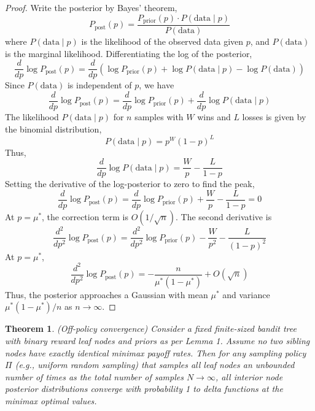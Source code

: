 \documentclass[11pt]{article}
\theoremstyle{definitionstyle}
\newtheorem{thm}{Theorem}
\newenvironment{framedminipage}
    {\begin{framed}\begin{minipage}{0.9\textwidth}}
    {\end{minipage}\end{framed}}
\begin{document}
\begin{proof} Write the posterior by Bayes' theorem,
\[
P_{\text{post}}(p) = \frac{P_{\text{prior}}(p) \cdot P(\text{data} \mid p)}{P(\text{data})}
\]
where \(P(\text{data} \mid p)\) is the likelihood of the observed data given \(p\), and \(P(\text{data})\) is the marginal likelihood. Differentiating the log of the posterior,
\[
\frac{d}{dp} \log P_{\text{post}}(p) = \frac{d}{dp} \left( \log P_{\text{prior}}(p) + \log P(\text{data} \mid p) - \log P(\text{data}) \right)
\]
Since \(P(\text{data})\) is independent of \(p\), we have
\[
\frac{d}{dp} \log P_{\text{post}}(p) = \frac{d}{dp} \log P_{\text{prior}}(p) + \frac{d}{dp} \log P(\text{data} \mid p)
\]
The likelihood \(P(\text{data} \mid p)\) for \(n\) samples with \(W\) wins and \(L\) losses is given by the binomial distribution,
\[
P(\text{data} \mid p) = p^W (1 - p)^L
\]
Thus,
\[
\frac{d}{dp} \log P(\text{data} \mid p) = \frac{W}{p} - \frac{L}{1 - p}
\]
Setting the derivative of the log-posterior to zero to find the peak,
\[
\frac{d}{dp} \log P_{\text{post}}(p) = \frac{d}{dp} \log P_{\text{prior}}(p) + \frac{W}{p} - \frac{L}{1 - p} = 0
\]
At \(p = \mu^*\), the correction term is \(O(1/\sqrt{n})\). The second derivative is
\[
\frac{d^2}{dp^2} \log P_{\text{post}}(p) = \frac{d^2}{dp^2} \log P_{\text{prior}}(p) - \frac{W}{p^2} - \frac{L}{(1 - p)^2}
\]
At \(p = \mu^*\),
\[
\frac{d^2}{dp^2} \log P_{\text{post}}(p) = -\frac{n}{\mu^*(1 - \mu^*)} + O(\sqrt{n})
\]
Thus, the posterior approaches a Gaussian with mean \(\mu^*\) and variance \(\mu^*(1 - \mu^*)/n\) as \(n \to \infty\).\end{proof}
\begin{framedminipage}
\begin{thm} (Off-policy convergence) Consider a fixed finite-sized bandit tree with binary reward leaf nodes and priors as per Lemma 1. Assume no two sibling nodes have exactly identical minimax payoff rates. Then for any sampling policy $\Pi$ (e.g., uniform random sampling) that samples all leaf nodes an unbounded number of times as the total number of samples $N \to \infty$, all interior node posterior distributions converge with probability 1 to delta functions at the minimax optimal values.
\end{thm}
\end{framedminipage}
\end{document}
